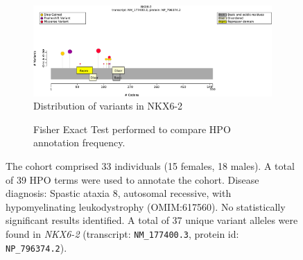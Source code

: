\begin{figure}[htbp]
\centering
\begin{subfigure}[b]{0.95\textwidth}
\centering
\includegraphics[width=\textwidth]{ img/NKX6-2_protein_diagram.pdf} 
\captionsetup{justification=raggedright,singlelinecheck=false}
\caption{Distribution of variants in NKX6-2}
\end{subfigure}

\vspace{2em}

\begin{subfigure}[b]{0.95\textwidth}
\centering
{}
\captionsetup{justification=raggedright,singlelinecheck=false}
\caption{Fisher Exact Test performed to compare HPO annotation frequency. }
\end{subfigure}

\vspace{2em}

\caption{The cohort comprised 33 individuals (15 females, 18 males). A total of 39 HPO terms were used to annotate the cohort. Disease diagnosis: Spastic ataxia 8, autosomal recessive, with hypomyelinating leukodystrophy (OMIM:617560). No statistically significant results identified. A total of 37 unique variant alleles were found in \textit{NKX6-2} (transcript: \texttt{NM\_177400.3}, protein id: \texttt{NP\_796374.2}).}
\end{figure}
